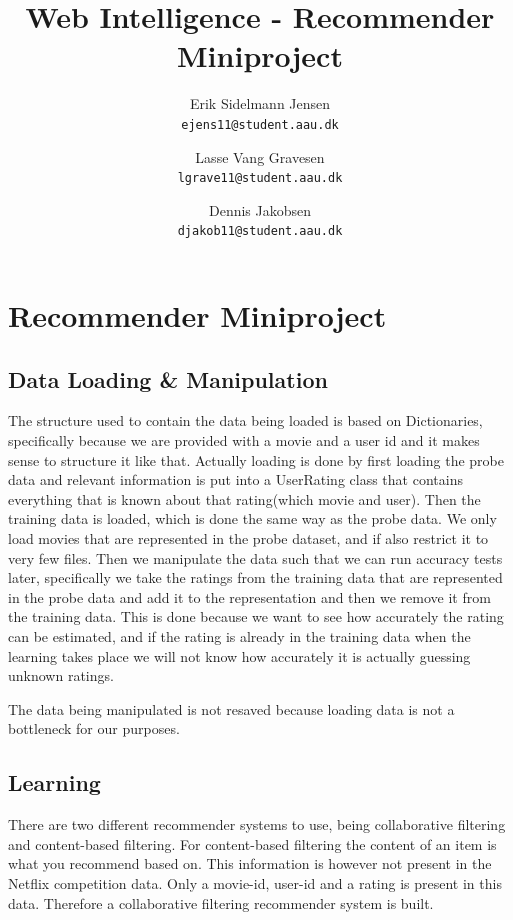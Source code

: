 

\author{
  Erik Sidelmann Jensen\\
  \texttt{ejens11@student.aau.dk}
  \and
  Lasse Vang Gravesen\\
  \texttt{lgrave11@student.aau.dk}
  \and
  Dennis Jakobsen\\
  \texttt{djakob11@student.aau.dk}  
}

\title{Web Intelligence - Recommender Miniproject}
\date{}


	\clearpage\maketitle
	\thispagestyle{empty}
	
	\chapter{Recommender Miniproject}
	\section{Data Loading \& Manipulation}
	The structure used to contain the data being loaded is based on Dictionaries, specifically because we are provided with a movie and a user id and it makes sense to structure it like that.
	Actually loading is done by first loading the probe data and relevant information is put into a UserRating class that contains everything that is known about that rating(which movie and user).
	Then the training data is loaded, which is done the same way as the probe data.
	We only load movies that are represented in the probe dataset, and if also restrict it to very few files. 
	Then we manipulate the data such that we can run accuracy tests later, specifically we take the ratings from the training data that are represented in the probe data and add it to the representation and then we remove it from the training data. This is done because we want to see how accurately the rating can be estimated, and if the rating is already in the training data when the learning takes place we will not know how accurately it is actually guessing unknown ratings.
	
	The data being manipulated is not resaved because loading data is not a bottleneck for our purposes.
	
	\section{Learning}
	There are two different recommender systems to use, being collaborative filtering and content-based filtering. For content-based filtering the content of an item is what you recommend based on. This information is however not present in the Netflix competition data. Only a movie-id, user-id and a rating is present in this data. Therefore a collaborative filtering recommender system is built.
	
